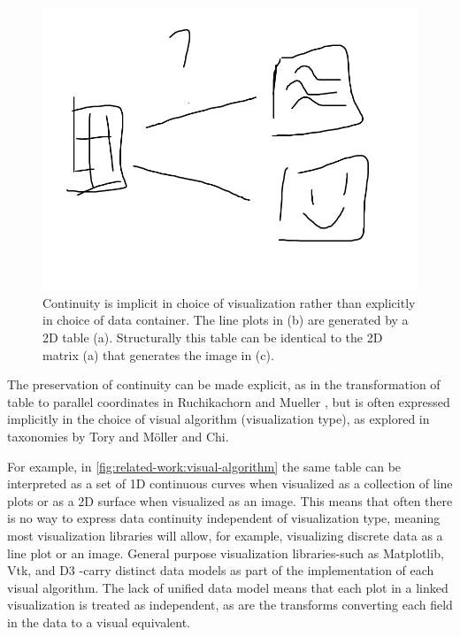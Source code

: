 \documentclass[10pt,journal,compsoc]{IEEEtran}
\theoremstyle{definition}
\theoremstyle{remark}
\begin{document}
\begin{figure}[!h]
  \includegraphics[width=\columnwidth]{whycontinuity.png}
  \caption{Continuity is implicit in choice of visualization rather than explicitly in choice of data container. The line plots in (b) are generated by a 2D table (a). Structurally this table can be identical to the 2D matrix (a) that generates the image in (c).}
  \label{fig:related-work:visual-algorithm}
\end{figure}

 The preservation of continuity can be made explicit, as in the transformation of table to parallel coordinates in Ruchikachorn and Mueller \cite{ruchikachornLearningVisualizationsAnalogy2015}, but is often expressed implicitly in the choice of visual algorithm (visualization type), as explored in taxonomies by Tory and M\"{o}ller \cite{toryRethinkingVisualizationHighlevel2004} and Chi\cite{chiTaxonomyVisualizationTechniques2000}.

For example, in \autoref{fig:related-work:visual-algorithm} the same table can be interpreted as a set of 1D continuous curves when visualized as a collection of line plots or as a 2D surface when visualized as an image.  This means that often there is no way to express data continuity independent of visualization type, meaning most visualization libraries will allow, for example, visualizing discrete data as a line plot or an image. General purpose visualization libraries-such as Matplotlib\cite{hunterMatplotlib2DGraphics2007}, Vtk\cite{hanwellVisualizationToolkitVTK2015,geveciVTK2012}, and D3 \cite{bostockDataDrivenDocuments2011}-carry distinct data models as part of the implementation of each visual algorithm. The lack of unified data model means that each plot in a linked\cite{beckerBrushingScatterplots1987,bujaInteractiveData1991} visualization is treated as independent, as are the transforms converting each field in the data to a visual equivalent.
\end{document}
